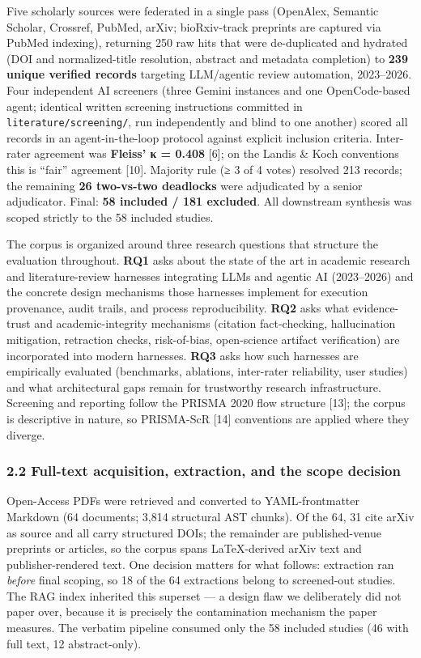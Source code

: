\documentclass[11pt]{article}
\begin{document}
Five scholarly sources were federated in a single pass (OpenAlex,
Semantic Scholar, Crossref, PubMed, arXiv; bioRxiv-track preprints are
captured via PubMed indexing), returning 250 raw hits that were
de-duplicated and hydrated (DOI and normalized-title resolution,
abstract and metadata completion) to \textbf{239 unique verified
records} targeting LLM/agentic review automation, 2023--2026. Four
independent AI screeners (three Gemini instances and one OpenCode-based
agent; identical written screening instructions committed in
\texttt{literature/screening/}, run independently and blind to one
another) scored all records in an agent-in-the-loop protocol against
explicit inclusion criteria. Inter-rater agreement was \textbf{Fleiss' κ
= 0.408} {[}6{]}; on the Landis \& Koch conventions this is ``fair''
agreement {[}10{]}. Majority rule (≥ 3 of 4 votes) resolved 213 records;
the remaining \textbf{26 two-vs-two deadlocks} were adjudicated by a
senior adjudicator. Final: \textbf{58 included / 181 excluded}. All
downstream synthesis was scoped strictly to the 58 included studies.

The corpus is organized around three research questions that structure
the evaluation throughout. \textbf{RQ1} asks about the state of the art
in academic research and literature-review harnesses integrating LLMs
and agentic AI (2023--2026) and the concrete design mechanisms those
harnesses implement for execution provenance, audit trails, and process
reproducibility. \textbf{RQ2} asks what evidence-trust and
academic-integrity mechanisms (citation fact-checking, hallucination
mitigation, retraction checks, risk-of-bias, open-science artifact
verification) are incorporated into modern harnesses. \textbf{RQ3} asks
how such harnesses are empirically evaluated (benchmarks, ablations,
inter-rater reliability, user studies) and what architectural gaps
remain for trustworthy research infrastructure. Screening and reporting
follow the PRISMA 2020 flow structure {[}13{]}; the corpus is
descriptive in nature, so PRISMA-ScR {[}14{]} conventions are applied
where they diverge.

\subsubsection{2.2 Full-text acquisition, extraction, and the scope
decision}\label{full-text-acquisition-extraction-and-the-scope-decision}

Open-Access PDFs were retrieved and converted to YAML-frontmatter
Markdown (64 documents; 3,814 structural AST chunks). Of the 64, 31 cite
arXiv as source and all carry structured DOIs; the remainder are
published-venue preprints or articles, so the corpus spans LaTeX-derived
arXiv text and publisher-rendered text. One decision matters for what
follows: extraction ran \emph{before} final scoping, so 18 of the 64
extractions belong to screened-out studies. The RAG index inherited this
superset --- a design flaw we deliberately did not paper over, because
it is precisely the contamination mechanism the paper measures. The
verbatim pipeline consumed only the 58 included studies (46 with full
text, 12 abstract-only).
\end{document}
